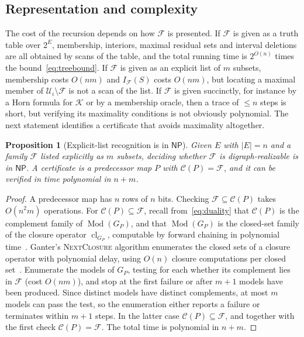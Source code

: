 \documentclass[11pt,a4paper]{article}
\theoremstyle{plain}
\newtheorem{proposition}[theorem]{Proposition}
\theoremstyle{definition}
\theoremstyle{remark}
\newcommand{\cC}{\mathcal C}
\newcommand{\cF}{\mathcal F}
\newcommand{\cK}{\mathcal K}
\newcommand{\cU}{\mathcal U}
\newcommand{\Mod}{\operatorname{Mod}}
\newcommand{\cl}{\operatorname{cl}}
\newcommand{\Int}{I_{\cF}}
\newcommand{\pw}[1]{2^{#1}}
\newcommand{\NP}{\mathsf{NP}}
\begin{document}
\subsection{Representation and complexity}\label{sec:complexity}

The cost of the recursion depends on how $\cF$ is presented. If $\cF$ is given as a truth table over $\pw{E}$, membership, interiors, maximal residual sets and interval deletions are all obtained by scans of the table, and the total running time is $2^{O(n)}$ times the bound~\eqref{eq:treebound}. If $\cF$ is given as an explicit list of $m$ subsets, membership costs $O(nm)$ and $\Int(S)$ costs $O(nm)$, but locating a maximal member of $\cU_i\setminus\cF$ is not a scan of the list. If $\cF$ is given succinctly, for instance by a Horn formula for $\cK$ or by a membership oracle, then a trace of $\le n$ steps is short, but verifying its maximality conditions is not obviously polynomial. The next statement identifies a certificate that avoids maximality altogether.

\begin{proposition}[Explicit-list recognition is in $\NP$]\label{prop:np}
Given $E$ with $|E|=n$ and a family $\cF$ listed explicitly as $m$ subsets, deciding whether $\cF$ is digraph-realizable is in $\NP$. A certificate is a predecessor map $P$ with $\cC(P)=\cF$, and it can be verified in time polynomial in $n+m$.
\end{proposition}

\begin{proof}
A predecessor map has $n$ rows of $n$ bits. Checking $\cF\subseteq\cC(P)$ takes $O(n^{2}m)$ operations. For $\cC(P)\subseteq\cF$, recall from~\eqref{eq:duality} that $\cC(P)$ is the complement family of $\Mod(G_P)$, and that $\Mod(G_P)$ is the closed-set family of the closure operator $\cl_{G_P}$, computable by forward chaining in polynomial time~\cite{dowling1984linear}. Ganter's \textsc{NextClosure} algorithm enumerates the closed sets of a closure operator with polynomial delay, using $O(n)$ closure computations per closed set~\cite{ganter2010two}. Enumerate the models of $G_P$, testing for each whether its complement lies in $\cF$ (cost $O(nm)$), and stop at the first failure or after $m+1$ models have been produced. Since distinct models have distinct complements, at most $m$ models can pass the test, so the enumeration either reports a failure or terminates within $m+1$ steps. In the latter case $\cC(P)\subseteq\cF$, and together with the first check $\cC(P)=\cF$. The total time is polynomial in $n+m$.
\end{proof}
\end{document}
